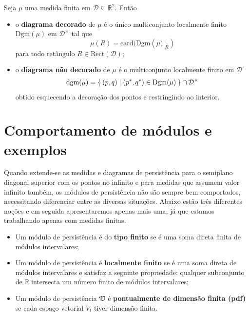 \begin{defi} 
    Seja $\mu$ uma medida finita em $\mathcal{D} \subseteq \mathbb{R}^2$. Então
    \begin{itemize}
        \item o \textbf{diagrama decorado} de $\mu$ é o único multiconjunto localmente finito
        $\text{Dgm}(\mu)$ em $\mathcal{D}^{\times}$ tal que 
        \begin{equation*}
            \mu(R) = \text{card}(\text{Dgm}(\mu\left.)\right|_R)
        \end{equation*}
        para todo retângulo $R \in \text{Rect}(\mathcal{D})$;
        \item o \textbf{diagrama não decorado} de $\mu$ é o multiconjunto localmente finito em 
        $\mathcal{D}^{\circ}$
        \begin{equation*}
            \text{dgm}(\mu) = \Set{(p,q) | (p^*, q^*) \in \text{Dgm}(\mu)} \cap \mathcal{D}^\times 
        \end{equation*}
        obtido esquecendo a decoração dos pontos e restringindo ao interior. 
    \end{itemize}
\end{defi}

\section{Comportamento de módulos e exemplos}

Quando extende-se as medidas e diagramas de persistência para o semiplano diagonal superior com os 
pontos no infinito e para medidas que assumem valor infinito também, os módulos de persistência não são
sempre bem comportados, necessitando diferenciar entre as diversas situações.
Abaixo estão três diferentes noções e em seguida apresentaremos apenas mais uma, já que estamos trabalhando
apenas com medidas finitas. 

\begin{itemize}
    \item Um módulo de persistência é do \textbf{tipo finito} se é uma soma direta finita de módulos intervalares;
    \item Um módulo de persistência é \textbf{localmente finito} se é uma soma direta de módulos intervalares
    e satisfaz a seguinte propriedade: qualquer subconjunto de $\mathbb{R}$ intersecta um número finito de 
    módulos intervalares;
    \item Um módulo de persistência $\mathfrak{V}$ é \textbf{pontualmente de dimensão finita (pdf)} se cada espaço
    vetorial $V_t$ tiver dimensão finita. 
\end{itemize}

